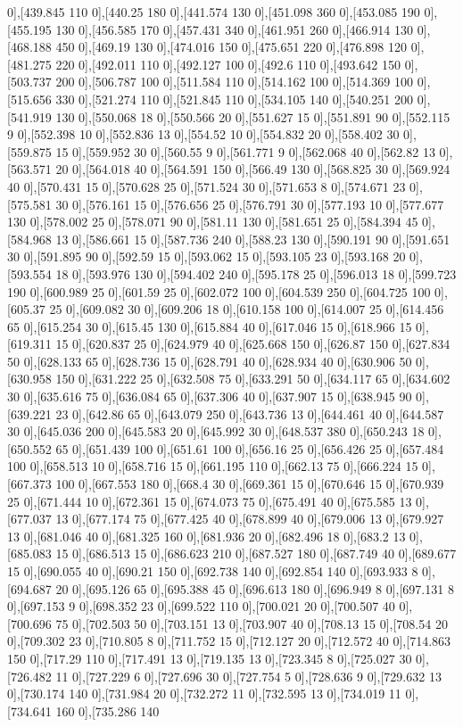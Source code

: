 {0],[439.845 110 0],[440.25 180 0],[441.574 130 0],[451.098 360 0],[453.085 190 0],[455.195 130 0],[456.585 170 0],[457.431 340 0],[461.951 260 0],[466.914 130 0],[468.188 450 0],[469.19 130 0],[474.016 150 0],[475.651 220 0],[476.898 120 0],[481.275 220 0],[492.011 110 0],[492.127 100 0],[492.6 110 0],[493.642 150 0],[503.737 200 0],[506.787 100 0],[511.584 110 0],[514.162 100 0],[514.369 100 0],[515.656 330 0],[521.274 110 0],[521.845 110 0],[534.105 140 0],[540.251 200 0],[541.919 130 0],[550.068 18 0],[550.566 20 0],[551.627 15 0],[551.891 90 0],[552.115 9 0],[552.398 10 0],[552.836 13 0],[554.52 10 0],[554.832 20 0],[558.402 30 0],[559.875 15 0],[559.952 30 0],[560.55 9 0],[561.771 9 0],[562.068 40 0],[562.82 13 0],[563.571 20 0],[564.018 40 0],[564.591 150 0],[566.49 130 0],[568.825 30 0],[569.924 40 0],[570.431 15 0],[570.628 25 0],[571.524 30 0],[571.653 8 0],[574.671 23 0],[575.581 30 0],[576.161 15 0],[576.656 25 0],[576.791 30 0],[577.193 10 0],[577.677 130 0],[578.002 25 0],[578.071 90 0],[581.11 130 0],[581.651 25 0],[584.394 45 0],[584.968 13 0],[586.661 15 0],[587.736 240 0],[588.23 130 0],[590.191 90 0],[591.651 30 0],[591.895 90 0],[592.59 15 0],[593.062 15 0],[593.105 23 0],[593.168 20 0],[593.554 18 0],[593.976 130 0],[594.402 240 0],[595.178 25 0],[596.013 18 0],[599.723 190 0],[600.989 25 0],[601.59 25 0],[602.072 100 0],[604.539 250 0],[604.725 100 0],[605.37 25 0],[609.082 30 0],[609.206 18 0],[610.158 100 0],[614.007 25 0],[614.456 65 0],[615.254 30 0],[615.45 130 0],[615.884 40 0],[617.046 15 0],[618.966 15 0],[619.311 15 0],[620.837 25 0],[624.979 40 0],[625.668 150 0],[626.87 150 0],[627.834 50 0],[628.133 65 0],[628.736 15 0],[628.791 40 0],[628.934 40 0],[630.906 50 0],[630.958 150 0],[631.222 25 0],[632.508 75 0],[633.291 50 0],[634.117 65 0],[634.602 30 0],[635.616 75 0],[636.084 65 0],[637.306 40 0],[637.907 15 0],[638.945 90 0],[639.221 23 0],[642.86 65 0],[643.079 250 0],[643.736 13 0],[644.461 40 0],[644.587 30 0],[645.036 200 0],[645.583 20 0],[645.992 30 0],[648.537 380 0],[650.243 18 0],[650.552 65 0],[651.439 100 0],[651.61 100 0],[656.16 25 0],[656.426 25 0],[657.484 100 0],[658.513 10 0],[658.716 15 0],[661.195 110 0],[662.13 75 0],[666.224 15 0],[667.373 100 0],[667.553 180 0],[668.4 30 0],[669.361 15 0],[670.646 15 0],[670.939 25 0],[671.444 10 0],[672.361 15 0],[674.073 75 0],[675.491 40 0],[675.585 13 0],[677.037 13 0],[677.174 75 0],[677.425 40 0],[678.899 40 0],[679.006 13 0],[679.927 13 0],[681.046 40 0],[681.325 160 0],[681.936 20 0],[682.496 18 0],[683.2 13 0],[685.083 15 0],[686.513 15 0],[686.623 210 0],[687.527 180 0],[687.749 40 0],[689.677 15 0],[690.055 40 0],[690.21 150 0],[692.738 140 0],[692.854 140 0],[693.933 8 0],[694.687 20 0],[695.126 65 0],[695.388 45 0],[696.613 180 0],[696.949 8 0],[697.131 8 0],[697.153 9 0],[698.352 23 0],[699.522 110 0],[700.021 20 0],[700.507 40 0],[700.696 75 0],[702.503 50 0],[703.151 13 0],[703.907 40 0],[708.13 15 0],[708.54 20 0],[709.302 23 0],[710.805 8 0],[711.752 15 0],[712.127 20 0],[712.572 40 0],[714.863 150 0],[717.29 110 0],[717.491 13 0],[719.135 13 0],[723.345 8 0],[725.027 30 0],[726.482 11 0],[727.229 6 0],[727.696 30 0],[727.754 5 0],[728.636 9 0],[729.632 13 0],[730.174 140 0],[731.984 20 0],[732.272 11 0],[732.595 13 0],[734.019 11 0],[734.641 160 0],[735.286 140 }
